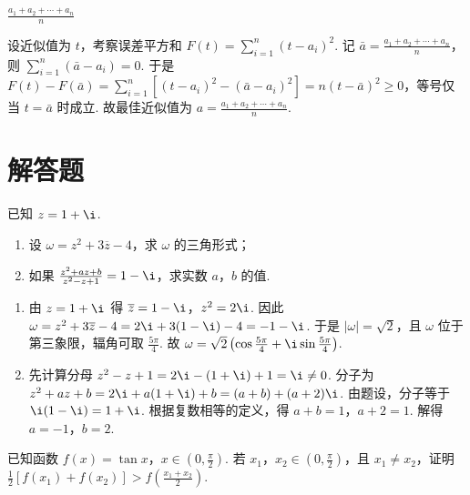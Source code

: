 \begin{answer}
\(\frac{a_1 + a_2 + \cdots + a_n}{n}\)
\end{answer}

\begin{solution}
设近似值为 \(t\)，考察误差平方和 \(F(t) = \sum_{i=1}^{n}\left(t - a_i\right)^2\). 记 \(\bar{a} = \frac{a_1 + a_2 + \cdots + a_n}{n}\)，则 \(\sum_{i=1}^{n}\left(\bar{a} - a_i\right) = 0\). 于是 \(F(t) - F(\bar{a}) = \sum_{i=1}^{n}\left[\left(t - a_i\right)^2 - \left(\bar{a} - a_i\right)^2\right] = n\left(t - \bar{a}\right)^2 \geqslant 0\)，等号仅当 \(t = \bar{a}\) 时成立. 故最佳近似值为 \(a = \frac{a_1 + a_2 + \cdots + a_n}{n}\).
\end{solution}

\section{解答题}

\begin{problem}
已知 \(z = 1 + \i\).

\begin{enumerate}
\item 设 \(\omega = z^2 + 3\overline{z} - 4\)，求 \(\omega\) 的三角形式；
\item 如果 \(\frac{z^2 + az + b}{z^2 - z + 1} = 1 - \i\)，求实数 \(a\)，\(b\) 的值.
\end{enumerate}
\end{problem}

\begin{solution}
\begin{enumerate}
\item 由 \(z = 1 + \i\) 得 \(\overline{z} = 1 - \i\)，\(z^2 = 2\i\). 因此 \(\omega = z^2 + 3\overline{z} - 4 = 2\i + 3(1 - \i) - 4 = -1 - \i\). 于是 \(|\omega| = \sqrt{2}\)，且 \(\omega\) 位于第三象限，辐角可取 \(\frac{5\pi}{4}\). 故 \(\omega = \sqrt{2}\left(\cos \frac{5\pi}{4} + \i\sin \frac{5\pi}{4}\right)\).
\item 先计算分母 \(z^2 - z + 1 = 2\i - (1 + \i) + 1 = \i \neq 0\). 分子为 \(z^2 + az + b = 2\i + a(1 + \i) + b = (a + b) + (a + 2)\i\). 由题设，分子等于 \(\i(1 - \i) = 1 + \i\). 根据复数相等的定义，得 \(a + b = 1\)，\(a + 2 = 1\). 解得 \(a = -1\)，\(b = 2\).
\end{enumerate}
\end{solution}

\begin{problem}
已知函数 \(f(x) = \tan x\)，\(x \in \left(0, \frac{\pi}{2}\right)\). 若 \(x_1\)，\(x_2 \in \left(0, \frac{\pi}{2}\right)\)，且 \(x_1 \neq x_2\)，证明 \(\frac{1}{2}\left[f(x_1) + f(x_2)\right] > f\left(\frac{x_1 + x_2}{2}\right)\).
\end{problem}

